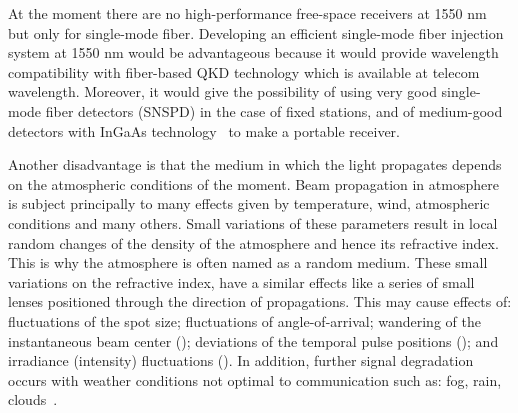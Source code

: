 At the moment there are no high-performance free-space receivers at 1550 nm but only for single-mode fiber. Developing an efficient single-mode fiber injection system at 1550 nm would be advantageous because it would provide wavelength compatibility with fiber-based QKD technology which is available at telecom wavelength. Moreover, it would give the possibility of using very good single-mode fiber detectors (SNSPD) in the case of fixed stations, and of medium-good detectors with InGaAs technology~\cite{b25} to make a portable receiver.

Another disadvantage is that the medium in which the light propagates depends on the atmospheric conditions of the moment.
Beam propagation in atmosphere is subject principally to many effects given by temperature, wind, atmospheric conditions and many others. Small variations of these parameters result in local random changes of the density of the atmosphere and hence its refractive index. This is why the atmosphere is often named as a random medium.
These small variations on the refractive index, have a similar effects like a series of small lenses positioned through the direction of propagations. This may cause effects of: fluctuations of the spot size; fluctuations of angle-of-arrival; wandering of the instantaneous beam center (); deviations of the temporal pulse positions (); and irradiance (intensity) fluctuations ().
In addition, further signal degradation occurs with weather conditions not optimal to communication such as: fog, rain, clouds~\cite{a25}.
